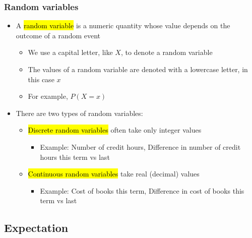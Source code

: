\documentclass[notes,11pt, aspectratio=169]{beamer}
\begin{document}

\begin{frame}
\frametitle{Random variables}

\begin{itemize}

\item A \hl{random variable} is a numeric quantity whose value depends on the outcome of a random event
\begin{itemize}
\item We use a capital letter, like $X$, to denote a random variable
\item The values of a random variable are denoted with a lowercase letter, in this case $x$
\item For example, $P(X = x)$
\end{itemize}

\item There are two types of random variables:
\begin{itemize}
\item \hl{Discrete random variables} often take only integer values
\begin{itemize}
\item Example: Number of credit hours, Difference in number of credit hours this term vs last
\end{itemize}
\item \hl{Continuous random variables} take real (decimal) values
\begin{itemize}
\item Example: Cost of books this term, Difference in cost of books this term vs last
\end{itemize}
\end{itemize}

\end{itemize}

\end{frame}


\subsection{Expectation}

\end{document}
